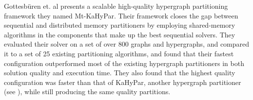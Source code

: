 Gottesb\"{u}ren et. al \cite{10.1145/3626527} presents a scalable high-quality hypergraph partitioning framework they named Mt-KaHyPar. Their framework closes the gap between sequential and distributed memory partitioners by employing shared-memory algorithms in the components that make up the best sequential solvers. They evaluated their solver on a set of over 800 graphs and hypergraphs, and compared it to a set of 25 existing partitioning algorithms, and found that their fastest configuration outperformed most of the existing hypergraph partitioners in both solution quality and execution time. They also found that the highest quality configuration was faster than that of KaHyPar, another hypergraph partitioner (see \cite{schlag2021highqualityhypergraphpartitioning}), while still producing the same quality partitions.

